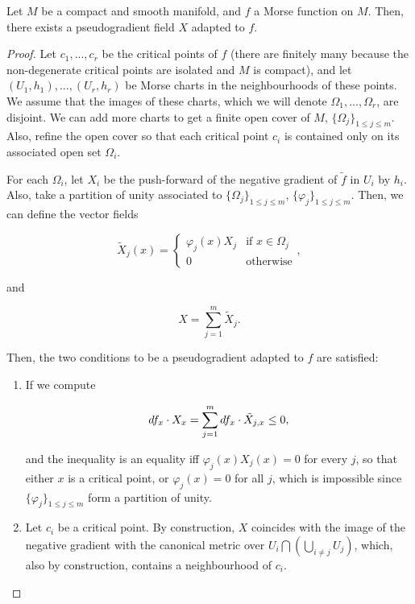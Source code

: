 \begin{prop}
Let $M$ be a compact and smooth manifold, and $f$ a Morse function on $M$. Then, there exists a pseudogradient field $X$ adapted to $f$.
\end{prop}

\begin{proof}
Let $c_1,...,c_r$ be the critical points of $f$ (there are finitely many because the non-degenerate critical points are isolated and $M$ is compact), and let $(U_1,h_1),...,(U_r,h_r)$ be Morse charts in the neighbourhoods of these points. We assume that the images of these charts, which we will denote $\Omega_1,...,\Omega_r$, are disjoint. We can add more charts to get a finite open cover of $M$, $\{\Omega_j\}_{1 \leq j \leq m}$. Also, refine the open cover so that each critical point $c_i$ is contained only on its associated open set $\Omega_i$.

For each $\Omega_i$, let $X_i$ be the push-forward of the negative gradient of $\tilde{f}$ in $U_i$ by $h_i$. Also, take a partition of unity associated to $\{\Omega_j\}_{1 \leq j \leq m}$, $\{\varphi_j\}_{1 \leq j \leq m}$. Then, we can define the vector fields

$$\tilde{X}_j(x) = \left\{ \begin{array}{ll} \varphi_j(x) X_j & \text{if } x \in \Omega_j \\ 0 & \text{otherwise} \end{array} \right. ,$$

and

$$X = \sum_{j=1}^m \tilde{X}_j .$$

Then, the two conditions to be a pseudogradient adapted to $f$ are satisfied:

\begin{enumerate}
\item If we compute

$$\\d f_x \cdot X_x = \sum_{j=1}^m \\d f_x \cdot \tilde{X}_{j,x} \leq 0 ,$$

and the inequality is an equality iff $\varphi_j(x) X_j(x) = 0$ for every $j$, so that either $x$ is a critical point, or $\varphi_j(x)=0$ for all $j$, which is impossible since $\{\varphi_j\}_{1\leq j \leq m}$ form a partition of unity.
\item Let $c_i$ be a critical point. By construction, $X$ coincides with the image of the negative gradient with the canonical metric over $U_i \bigcap \left( \bigcup_{i \neq j} U_j\right)$, which, also by construction, contains a neighbourhood of $c_i$.
\end{enumerate}
\end{proof}

